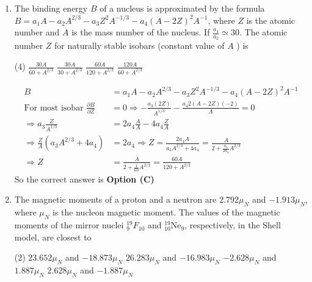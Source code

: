 \begin{enumerate}
\begin{answer}
\begin{align*}
\therefore I_{L i}^{\mu}&=197 A=197 I_{L i}
\intertext{	Thus correct option is (C)}
\intertext{	Note: Answer does not match}
\end{align*}
So the correct answer is \textbf{Option (A)}
\end{answer}
	\item The binding energy $B$ of a nucleus is approximated by the formula $B=a_{1} A-a_{2} A^{2 / 3}-a_{3} Z^{2} A^{-1 / 3}-a_{4}(A-2 Z)^{2} A^{-1}$, where $Z$ is the atomic number and $A$ is the mass number of the nucleus. If $\frac{a_{4}}{a_{2}} \simeq 30$. The atomic number $Z$ for naturally stable isobars (constant value of $A$ ) is
{	}
\begin{tasks}(4)
\task[\textbf{A.}]  $\frac{30 A}{60+A^{2 / 3}}$
\task[\textbf{B.}] $\frac{30 A}{30+A^{2 / 3}}$
\task[\textbf{C.}]  $\frac{60 A}{120+A^{2 / 3}}$
\task[\textbf{D.}] $\frac{120 A}{60+A^{2 / 3}}$
\end{tasks}
\begin{answer}
\begin{align*}
B&=a_{1} A-a_{2} A^{2 / 3}-a_{3} Z^{2} A^{-1 / 3}-a_{4}(A-2 Z)^{2} A^{-1}\\
\text{For most isobar }\frac{\partial B}{\partial Z}&=0 \Rightarrow-\frac{a_{3}(2 Z)}{A^{1 / 3}}-\frac{a_{4} 2(A-2 Z)(-2)}{A}=0\\
\Rightarrow a_{3} \frac{Z}{A^{1 / 3}}&=2 a_{4} \frac{A}{A}-4 a_{4} \frac{Z}{A}\\
\Rightarrow \frac{Z}{A}\left(a_{3} A^{2 / 3}+4 a_{4}\right)&=2 a_{4} \Rightarrow Z=\frac{2 a_{4} A}{a_{3} A^{2 / 3}+4 a_{4}}=\frac{A}{2+\frac{a_{3}}{2 a_{4}} A^{2 / 3}}\\
\Rightarrow Z&=\frac{A}{2+\frac{1}{60} A^{2 / 3}}=\frac{60 A}{120+A^{2 / 3}}
\end{align*}
So the correct answer is \textbf{Option (C)}
\end{answer}
	\item The magnetic moments of a proton and a neutron are $2.792 \mu_{N}$ and $-1.913 \mu_{N}$, where $\mu_{N}$ is the nucleon magnetic moment. The values of the magnetic moments of the mirror nuclei ${ }_{9}^{19} F_{10}$ and ${ }_{10}^{19} \mathrm{Ne}_{9}$, respectively, in the Shell model, are closest to
{	}
\begin{tasks}(2)
\task[\textbf{A.}] $23.652 \mu_{N}$ and $-18.873 \mu_{N}$
\task[\textbf{B.}] $26.283 \mu_{N}$ and $-16.983 \mu_{N}$
\task[\textbf{C.}] $-2.628 \mu_{N}$ and $1.887 \mu_{N}$
\task[\textbf{D.}] $2.628 \mu_{N}$ and $-1.887 \mu_{N}$

\end{tasks}
\end{enumerate}
